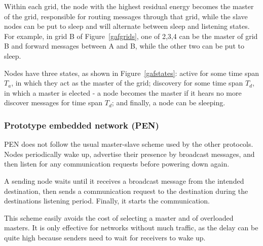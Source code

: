 Within each grid, the node with the highest residual energy becomes the master
of the grid, responsible for routing messages through that grid, while the
slave nodes can be put to sleep and will alternate between sleep and listening
states. For example, in grid B of Figure~\ref{gafgrids}, one of 2,3,4 can be the
master of grid B and forward messages between A and B, while the other two can
be put to sleep.

Nodes have three states, as shown in Figure~\ref{gafstates}: active for some time span $T_{a}$, in which they
act as the master of the grid; discovery for some time span $T_{d}$, in which a
master is elected - a node becomes the master if it hears no more discover messages
for time span $T_{d}$; and finally, a node can be sleeping.


\subsubsection{Prototype embedded network (PEN)}\label{pen}
PEN\cite{girling2000design} does not follow the usual master-slave scheme
used by the other protocols. Nodes periodically wake up, advertise their
presence
by broadcast messages, and then listen for any communication requests before
powering down again.

A sending node waits until it receives a broadcast message from the intended
destination, then sends a communication request to the destination during
the destinations listening period. Finally, it starts the communication.

This scheme easily avoids the cost of selecting a master and of overloaded
masters. It is only effective for networks without much traffic, as the delay
can be quite high because senders need to wait for receivers to wake up.
